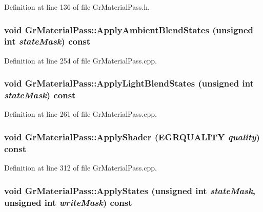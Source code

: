 Definition at line 136 of file GrMaterialPass.h.\hypertarget{class_gr_material_pass_645501d055a4d4cffb0482a8f91448be}{
\subsubsection[{ApplyAmbientBlendStates}]{\setlength{\rightskip}{0pt plus 5cm}void GrMaterialPass::ApplyAmbientBlendStates (unsigned int {\em stateMask}) const}}
\label{class_gr_material_pass_645501d055a4d4cffb0482a8f91448be}




Definition at line 254 of file GrMaterialPass.cpp.\hypertarget{class_gr_material_pass_dfdd256fcb0d7bfac731b6db4d9eb575}{
\subsubsection[{ApplyLightBlendStates}]{\setlength{\rightskip}{0pt plus 5cm}void GrMaterialPass::ApplyLightBlendStates (unsigned int {\em stateMask}) const}}
\label{class_gr_material_pass_dfdd256fcb0d7bfac731b6db4d9eb575}




Definition at line 261 of file GrMaterialPass.cpp.\hypertarget{class_gr_material_pass_e7fce70c080ca855afb28e2cd0e729bc}{
\subsubsection[{ApplyShader}]{\setlength{\rightskip}{0pt plus 5cm}void GrMaterialPass::ApplyShader ({\bf EGRQUALITY} {\em quality}) const}}
\label{class_gr_material_pass_e7fce70c080ca855afb28e2cd0e729bc}




Definition at line 312 of file GrMaterialPass.cpp.\hypertarget{class_gr_material_pass_272b822ee696efb7e967a9565cd79a97}{
\subsubsection[{ApplyStates}]{\setlength{\rightskip}{0pt plus 5cm}void GrMaterialPass::ApplyStates (unsigned int {\em stateMask}, \/  unsigned int {\em writeMask}) const}}
\label{class_gr_material_pass_272b822ee696efb7e967a9565cd79a97}




